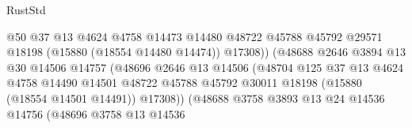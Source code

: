 \begin{lexlean}{RustStd}
\begin{coremodule}
                                            @50
                                            @37
                                            @13
                                            @4624
                                            @4758
                                            @14473
                                            @14480
                                            @48722
                                            @45788
                                            @45792
                                            @29571
                                            @18198
                                            (@15880 (@18554 @14480 @14474))
                                            @17308))
                                        (@48688
                                          @2646
                                          @3894
                                          @13
                                          @30
                                          @14506
                                          @14757
                                          (@48696
                                            @2646
                                            @13
                                            @14506
                                            (@48704
                                              @125
                                              @37
                                              @13
                                              @4624
                                              @4758
                                              @14490
                                              @14501
                                              @48722
                                              @45788
                                              @45792
                                              @30011
                                              @18198
                                              (@15880 (@18554 @14501 @14491))
                                              @17308))
                                          (@48688
                                            @3758
                                            @3893
                                            @13
                                            @24
                                            @14536
                                            @14756
                                            (@48696
                                              @3758
                                              @13
                                              @14536

\end{coremodule}
\end{lexlean}
